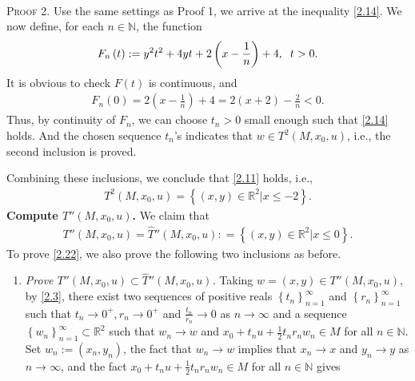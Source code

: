 \documentclass[a4paper]{article}
\numberwithin{equation}{section}
\begin{document}
\begin{enumerate}
\begin{enumerate}
\\
\textsc{Proof 2.} Use the same settings as Proof 1, we arrive at the inequality \eqref{2.14}. We now define, for each $n\in \mathbb{N}$, the function 
\begin{align}
F_n\left( t \right): = {y^2}{t^2} + 4yt + 2\left( {x - \frac{1}{n}} \right) + 4,\hspace{0.2cm} t > 0.
\end{align}
It is obvious to check $F\left(t\right)$ is continuous, and 
\begin{align}
{F_n}\left( 0 \right) = 2\left( {x - \frac{1}{n}} \right) + 4 = 2\left( {x + 2} \right) - \frac{2}{n} < 0.
\end{align}
Thus, by continuity of $F_n$, we can choose $t_n>0$ small enough such that \eqref{2.14} holds. And the chosen sequence $t_n$'s indicates that $w\in T^2\left(M,x_0,u\right)$, i.e., the second inclusion is proved.
\end{enumerate}
Combining these inclusions, we conclude that \eqref{2.11} holds, i.e.,
\begin{align}
\label{2.21}
{T^2}\left( {M,{x_0},u} \right) = \left\{ {\left( {x,y} \right) \in {\mathbb{R}^2}|x \le  - 2} \right\}.
\end{align}
\textbf{Compute $T''\left( {M,{x_0},u} \right)$.} We claim that
\begin{align}
\label{2.22}
T''\left( {M,{x_0},u} \right) = \widehat T''\left( {M,{x_0},u} \right): = \left\{ {\left( {x,y} \right) \in {\mathbb{R}^2}|x \le 0} \right\}.
\end{align}
To prove \eqref{2.22}, we also prove the following two inclusions as before.
\begin{enumerate}
\item \textit{Prove $T''\left( {M,{x_0},u} \right) \subset \widehat T''\left( {M,{x_0},u} \right)$.} Taking $w=\left(x,y\right)\in T''\left(M,x_0,u\right)$, by \eqref{2.3}, there exist two sequences of positive reals $\left\{ {{t_n}} \right\}_{n = 1}^\infty $ and $\left\{ {{r_n}} \right\}_{n = 1}^\infty $ such that $t_n\to 0^+,r_n\to 0^+$ and $\frac{{{t_n}}}{{{r_n}}} \to 0$ as $n\to \infty$ and a sequence $\left\{ {{w_n}} \right\}_{n = 1}^\infty  \subset {\mathbb{R}^2}$ such that $w_n\to w$ and ${x_0} + {t_n}u + \frac{1}{2}{t_n}{r_n}{w_n} \in M$ for all $n\in \mathbb{N}$. Set $w_n:=\left(x_n,y_n\right)$, the fact that $w_n\to w$ implies that $x_n\to x$ and $y_n\to y$ as $n\to \infty$, and the fact ${x_0} + {t_n}u + \frac{1}{2}{t_n}{r_n}{w_n} \in M$ for all $n\in \mathbb{N}$ gives
\begin{align}

\end{align}
\end{enumerate}
\end{enumerate}
\end{document}
